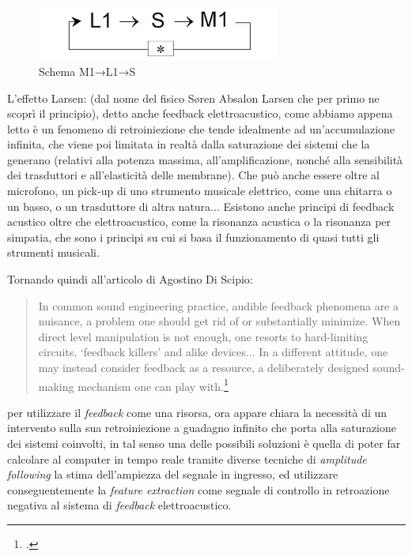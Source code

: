 \begin{figure}[h!]
    \begin{center}
        \vspace{0.5cm}
        \includegraphics[width=8cm]{figures/larsen_Feedback_scheme.png}
        \caption{Schema M1→L1→S}
        \vspace{0.5cm}
        \end{center}
\end{figure} 

L'effetto Larsen: (dal nome del fisico Søren Absalon Larsen
che per primo ne scoprì il principio), detto anche feedback elettroacustico,
come abbiamo appena letto è un fenomeno di retroiniezione che tende idealmente 
ad un'accumulazione infinita, che viene poi limitata in realtà dalla saturazione dei sistemi 
che la generano (relativi alla potenza massima, all'amplificazione, nonché alla sensibilità dei
trasduttori e all'elasticità delle membrane). Che può anche essere oltre al microfono, un
pick-up di uno strumento musicale elettrico, come una chitarra o un basso, o un trasduttore di
altra natura... 
Esistono anche principi di feedback acustico oltre che elettroacustico, 
come la risonanza acustica o la risonanza per simpatia,
che sono i principi su cui si basa il funzionamento di quasi tutti gli strumenti musicali. 

Tornando quindi all'articolo di Agostino Di Scipio:

\begin{quote}
In common sound engineering practice, audible feedback phenomena are a nuisance, a problem one
should get rid of or substantially minimize. When direct level manipulation is not enough, one
resorts to hard-limiting circuits, ‘feedback killers’ and alike devices... 
In a different attitude, one may instead consider feedback as
a resource, a deliberately designed sound-making mechanism one can play with.\footcite{di_scipio_relational_2022}
\end{quote}

per utilizzare il \emph{feedback} come una risorsa,
ora appare chiara la necessità di un intervento sulla sua retroiniezione a guadagno infinito 
che porta alla saturazione dei sistemi coinvolti, 
in tal senso una delle possibili soluzioni è quella di poter far calcolare
al computer in tempo reale tramite diverse tecniche di \textit{amplitude following} la stima dell'ampiezza
del segnale in ingresso, ed utilizzare conseguentemente la \textit{feature extraction} 
come segnale di controllo in retroazione negativa al sistema di \emph{feedback} elettroacustico.


